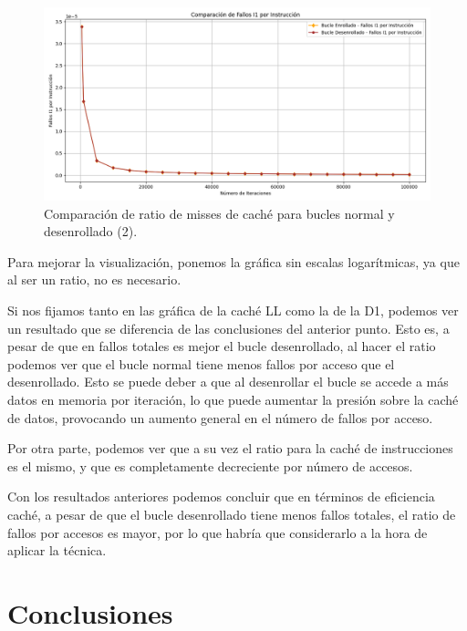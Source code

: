 \documentclass[a4paper,twocolumn]{article}
\begin{document}
\begin{enumerate}
    \begin{figure}[H]
        \centering
        \includegraphics[width=\columnwidth]{img/cacheRatioI1.png}
        \caption{Comparación de ratio de misses de caché para bucles normal y desenrollado (2).}
        \label{fig:real_vs_cpu_time}
    \end{figure}

    Para mejorar la visualización, ponemos la gráfica sin escalas logarítmicas, ya que al ser un ratio, no es necesario. 

    Si nos fijamos tanto en las gráfica de la caché LL como la de la D1, podemos ver un resultado que se diferencia de las conclusiones del anterior punto. Esto es, a pesar de que en fallos totales es mejor el bucle desenrollado, al hacer el ratio podemos ver que el bucle normal tiene menos fallos por acceso que el desenrollado. Esto se puede deber a que al desenrollar el bucle se accede a más datos en memoria por iteración, lo que puede aumentar la presión sobre la caché de datos, provocando un aumento general en el número de fallos por acceso.

    Por otra parte, podemos ver que a su vez el ratio para la caché de instrucciones es el mismo, y que es completamente decreciente por número de accesos.
\end{enumerate}

Con los resultados anteriores podemos concluir que en términos de eficiencia caché, a pesar de que el bucle desenrollado tiene menos fallos totales, el ratio de fallos por accesos es mayor, por lo que habría que considerarlo a la hora de aplicar la técnica.


	
\section{Conclusiones}
\end{document}
